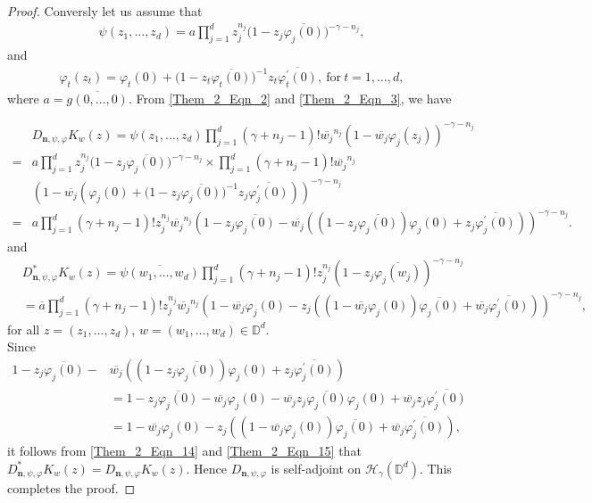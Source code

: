 \documentclass[12pt, reqno]{amsart}
\theoremstyle{definition}
\theoremstyle{remark}
\numberwithin{equation}{section}
\newcommand{\mfn}{\mathbf n}
\begin{document}
\begin{proof}
 	Conversly let us assume that 
 	\begin{gather*}
 	\psi(z_1, \dots, z_d)=a\prod_{j=1}^dz_j^{n_j}\big(1-z_j\overline{\varphi_j(0)}\big)^{-\gamma-n_j},
 	\end{gather*}
 	and 
 	\begin{gather*}
 	\varphi_t(z_t)=\varphi_t(0)+\big(1-z_t\overline{\varphi_t(0)}\big)^{-1}z_t\overline{\varphi_t^{\prime}(0)},~ \mbox{for}~ t=1, \dots, d,
 	\end{gather*}
 	where $a=\overline{g(0, \dots, 0)}$.
 	From \eqref{Them_2_Eqn_2} and \eqref{Them_2_Eqn_3}, we have  
 	
 	\begin{align}\label{Them_2_Eqn_14}
 	  &D_{\mfn,\psi, \varphi}K_w(z)
 	= \psi(z_1, \dots, z_d)\prod_{j=1}^d(\gamma+n_j-1)!\overline{w_j}^{n_j}(1-\overline{w_j}\varphi_j(z_j))^{-\gamma-n_j}\nonumber\\
 	=&a\prod_{j=1}^dz_j^{n_j}\big(1-z_j\overline{\varphi_j(0)}\big)^{-\gamma-n_j}\times\prod_{j=1}^d(\gamma+n_j-1)!\overline{w_j}^{n_j}\nonumber\\
 	&\left(1-\overline{w_j}\left(\varphi_j(0)+\big(1-z_j\overline{\varphi_j(0)}\big)^{-1}z_j\overline{\varphi_j^{\prime}(0)}\right)\right)^{-\gamma-n_j}\nonumber\\
 	=&a\prod_{j=1}^d(\gamma+n_j-1)!z_j^{n_j}\overline{w_j}^{n_j}\left(1-z_j\overline{\varphi_j(0)}-\overline{w_j}\left((1-z_j\overline{\varphi_j(0)})\varphi_j(0)+z_j\overline{\varphi_j^{\prime}(0)}\right) \right)^{-\gamma-n_j}.
 	\end{align} 
 	and 
 	\begin{align}\label{Them_2_Eqn_15}
 	& D_{\mfn,\psi, \varphi}^*K_w(z)
 	= \overline{\psi(w_1, \dots, w_d)}\prod_{j=1}^d(\gamma+n_j-1)!z_j^{n_j}(1-z_j\overline{\varphi_j(w_j)})^{-\gamma-n_j}\nonumber\\
  	&=\overline{a}\prod_{j=1}^d(\gamma+n_j-1)!z_j^{n_j}\overline{w_j}^{n_j}\left(1-\overline{w_j}\varphi_j(0)-z_j\left((1-\overline{w_j}\varphi_j(0))\overline{\varphi_j(0)}+\overline{w_j}\overline{\varphi_j^{\prime}(0)}\right) \right)^{-\gamma-n_j},
 	\end{align} 
 	for all $z=(z_1, \dots, z_d)$, $w=(w_1, \dots, w_d)\in \mathbb{D}^d$.\\
 	 	Since 
 	\begin{align}\label{Them_2_Eqn_16}
 	1-z_j\overline{\varphi_j(0)}-&\overline{w_j}\left((1-z_j\overline{\varphi_j(0)})\varphi_j(0)+z_j\overline{\varphi_j^{\prime}(0)}\right)\nonumber\\
 	&=1-z_j\overline{\varphi_j(0)}-\overline{w_j}\varphi_j(0)-\overline{w_j}z_j\overline{\varphi_j(0)}\varphi_j(0)+\overline{w_j}z_j\overline{\varphi_j^{\prime}(0)}\nonumber\\
 	&=1-\overline{w_j}\varphi_j(0)-z_j\left((1-\overline{w_j}\varphi_j(0))\overline{\varphi_j(0)}+\overline{w_j}\overline{\varphi_j^{\prime}(0)}\right),
 	\end{align}
 	it follows from \eqref{Them_2_Eqn_14} and \eqref{Them_2_Eqn_15} that 
 	$D_{\mfn,\psi, \varphi}^*K_w(z)=D_{\mfn,\psi, \varphi}K_w(z)$. Hence $D_{\mfn,\psi,\varphi}$ is self-adjoint on $\mathcal{H}_\gamma(\mathbb{D}^d)$. This completes the proof.
 \end{proof}
\end{document}
